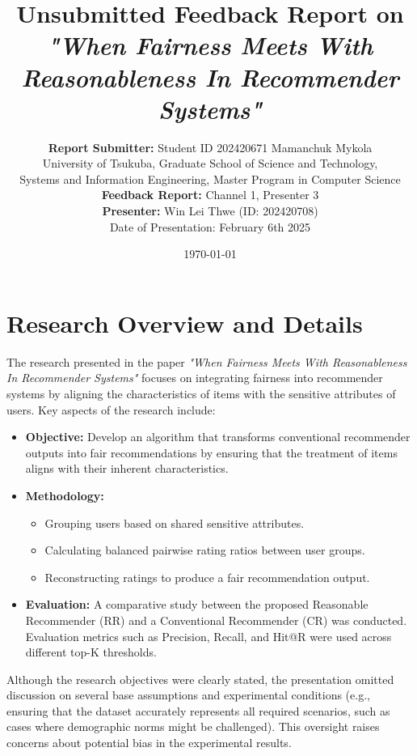 \documentclass[12pt]{article}
\title{Unsubmitted Feedback Report on\\ \textit{"When Fairness Meets With Reasonableness In Recommender Systems"}}
\author{%
  \textbf{Report Submitter:} Student ID 202420671 Mamanchuk Mykola\\[1mm]
  University of Tsukuba, Graduate School of Science and Technology,\\
  Systems and Information Engineering, Master Program in Computer Science\\[2mm]
  \textbf{Feedback Report:} Channel 1, Presenter 3\\[1mm]
  \textbf{Presenter:} Win Lei Thwe (ID: 202420708) \\ Date of Presentation: February 6th 2025
}
\date{\today}
\begin{document}
\maketitle

\section*{Research Overview and Details}
The research presented in the paper \textit{"When Fairness Meets With Reasonableness In Recommender Systems"} focuses on integrating fairness into recommender systems by aligning the characteristics of items with the sensitive attributes of users. Key aspects of the research include:
\begin{itemize}[noitemsep]
    \item \textbf{Objective:} Develop an algorithm that transforms conventional recommender outputs into fair recommendations by ensuring that the treatment of items aligns with their inherent characteristics.
    \item \textbf{Methodology:} 
    \begin{itemize}[noitemsep]
        \item Grouping users based on shared sensitive attributes.
        \item Calculating balanced pairwise rating ratios between user groups.
        \item Reconstructing ratings to produce a fair recommendation output.
    \end{itemize}
    \item \textbf{Evaluation:} A comparative study between the proposed Reasonable Recommender (RR) and a Conventional Recommender (CR) was conducted. Evaluation metrics such as Precision, Recall, and Hit@R were used across different top-K thresholds.
\end{itemize}
Although the research objectives were clearly stated, the presentation omitted discussion on several base assumptions and experimental conditions (e.g., ensuring that the dataset accurately represents all required scenarios, such as cases where demographic norms might be challenged). This oversight raises concerns about potential bias in the experimental results.
\end{document}
